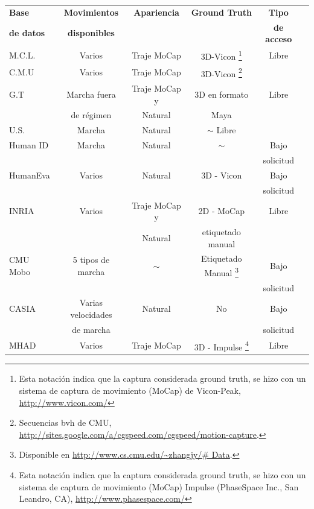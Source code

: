 \begin{table}[h!]
\begin{minipage}{\textwidth}
\begin{tabular}{||l|ccccc||}
\rowcolor[HTML]{CBCEFB}
\textbf{Base}     & \textbf{Movimientos}  & \textbf{Apariencia}    & \textbf{Ground Truth} & \textbf{Tipo}  & \\
\rowcolor[HTML]{CBCEFB}
\textbf{de datos} & \textbf{disponibles} &               &           & \textbf{de acceso} & \\
\hline \hline
{M.C.L. }   & Varios    &  Traje MoCap & 3D-Vicon \footnote{ Esta notación indica que la captura considerada ground truth, se hizo con un sistema  de captura de movimiento (MoCap) de Vicon-Peak, \textcolor{blue}{\underline{\url{http://www.vicon.com/}}} } & Libre & \\ \hline
{C.M.U }    & Varios    &  Traje MoCap & 3D-Vicon \footnote{Secuencias bvh de CMU, \textcolor{blue}{\underline{\url{http://sites.google.com/a/cgspeed.com/cgspeed/motion-capture}}}.} & & \\ \hline
{G.T} &     Marcha fuera&     Traje MoCap y       & 3D  en formato & Libre & \\ 
 &	   de régimen  &  Natural   &   Maya & & \\ \hline
U.S. &       Marcha    &  Natural    &  $\sim$ Libre&       \\	\hline
Human ID &     Marcha    & Natural  & $\sim$ & Bajo  &       \\ 
						 &        &   &  & solicitud &       \\ \hline
HumanEva &     Varios    & Natural  & 3D - Vicon & Bajo  &       \\ 
						 &        &   &  & solicitud &       \\ \hline
INRIA &       Varios    & Traje MoCap y            & 2D - MoCap &  Libre &       \\
&           & Natural            &   etiquetado manual  & &         \\ \hline
CMU Mobo &     5 tipos de marcha    & $\sim$           & Etiquetado Manual \footnote{Disponible en  \textcolor{blue}{\underline{\url{http://www.cs.cmu.edu/~zhangjy/\# Data}}}.}& Bajo  &       \\ 
 							 &        &   &  & solicitud &       \\ \hline
CASIA &  Varias velocidades       &   Natural         & No  &    Bajo     &      \\ 
& de marcha        &            &   & solicitud        &      \\ \hline
MHAD & Varios        & Traje MoCap            & 3D - Impulse \footnote{ Esta notación indica que la captura considerada ground truth, se hizo con un sistema  de captura de movimiento (MoCap) Impulse (PhaseSpace Inc., San Leandro, CA), \textcolor{blue}{\underline{\url{http://www.phasespace.com/}}} }    & Libre  &       \\
\hline
	\end{tabular}
	\end{minipage}	
\end{table}

